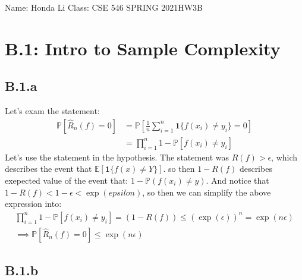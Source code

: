 \documentclass[]{article}
\begin{document}
\begin{center}
    Name: Honda Li \quad Class: CSE 546 SPRING 2021\quad HW3B 
\end{center}

\section*{B.1: Intro to Sample Complexity}
    \subsection*{B.1.a}
        Let's exam the statement: 
        \begin{align*}\tag{B.1.a}\label{eqn:B.1.a}
            \mathbb{P}\left[
                \hat{R}_n(f) = 0
            \right]
            &= 
            \mathbb{P}\left[
                \frac{1}{n}\sum_{i = 1}^{n}
                    \mathbf{1}\{
                        f(x_i) \ne y_i
                    \} = 0
            \right]
            \\
            &= 
            \prod_{i = 1}^{n}
                1 - \mathbb{P}\left[
                    f(x_i) \ne y_i
                \right]
        \end{align*}
    Let's use the statement in the hypothesis. The statement was $R(f) > \epsilon$, which describes the event that $\mathbb{E}\left[\mathbf{1}\{f(x)\ne Y\}\right]$. so then $1 - R(f)$ describes exepected value of the event that: $1 - \mathbb{P}\left(f(x_i) \ne y\right)$. And notice that $1 - R(f)< 1 - \epsilon < \exp(epsilon)$, so then we can simplify the above expression into: 
    \begin{align*}\tag{B.1.a.1}\label{eqn:B.1.a.1}
        \prod_{i = 1}^{n}
        1 - \mathbb{P}\left[
            f(x_i) \ne y_i
        \right] = (1 - R(f)) \le (\exp(\epsilon))^n = \exp(n\epsilon)
        \\
        \implies 
        \mathbb{P}\left[
            \hat{R}_n(f) = 0
        \right] \le \exp(n\epsilon)
    \end{align*}

    \subsection*{B.1.b}    
        
    
\end{document}
